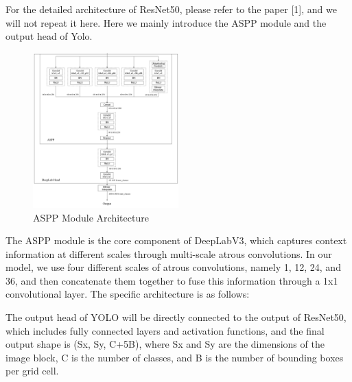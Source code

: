 \documentclass[conference]{IEEEtran}
\begin{document}

For the detailed architecture of ResNet50, please refer to the paper [1], and we will not repeat it here. Here we mainly introduce the ASPP module and the output head of Yolo.

\begin{figure}[htbp]
    \centering
    \centerline{\includegraphics[width=0.5\textwidth]{fig/aspp.png}}
    \caption{ASPP Module Architecture}
    \label{fig:aspp}
\end{figure}


The ASPP module is the core component of DeepLabV3, which captures context information at different scales through multi-scale atrous convolutions. In our model, we use four different scales of atrous convolutions, namely 1, 12, 24, and 36, and then concatenate them together to fuse this information through a 1x1 convolutional layer. The specific architecture is as follows:


The output head of YOLO will be directly connected to the output of ResNet50, which includes fully connected layers and activation functions, and the final output shape is (Sx, Sy, C+5B), where Sx and Sy are the dimensions of the image block, C is the number of classes, and B is the number of bounding boxes per grid cell. 
\end{document}
